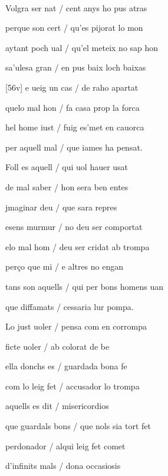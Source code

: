 \documentclass[12pt]{article}
\renewcommand{\espaiAbansEtiquetaPoema}{\vspace{0ex}}
\begin{document}
\begin{estrofa}

\espaiAbansEtiquetaPoema

\\

\end{estrofa}


\begin{estrofa}

 Volgra ser nat / cent anys ho pus atras

 perque son cert / qu'es pijorat lo mon

 aytant poch ual / qu'el meteix no sap hon

 sa'ulesa gran / en pus baix loch baixas

 [56v] e ueig un cas / de raho apartat

 quelo mal hon / fa casa prop la forca

 hel home iust / fuig es'met en cauorca

 per aquell mal / que iames ha pensat.

\end{estrofa}



\begin{estrofa}

 Foll es aquell / qui uol hauer usat

 de mal saber / hon sera ben entes

 jmaginar deu / que sara repres

 esens murmur / no deu ser comportat

 elo mal hom / deu ser cridat ab trompa

 per\c{c}o que mi / e altres no engan

 tans son aquells / qui per bons homens uan

 que diffamats / cessaria lur pompa.

\end{estrofa}



\begin{estrofa}

 Lo just uoler / pensa com en corrompa

 ficte uoler / ab colorat de be

 ella donchs es / guardada bona fe

 com lo leig fet / accusador lo trompa

 aquells es dit / misericordios

 que guardals bons / que nols sia tort fet

 perdonador / alqui leig fet comet

 d'infinits mals / dona occasiosis

\end{estrofa}
\end{document}
